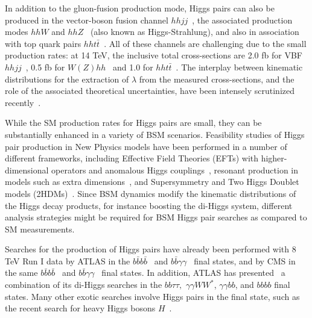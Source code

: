 In addition to the gluon-fusion production mode, Higgs pairs
can also be produced in the vector-boson fusion
channel $hhjj$~\cite{Contino:2010mh,Dolan:2013rja,Dolan:2015zja,
  Brooijmans:2014eja},
the associated production modes
$hhW$ and $hhZ$~\cite{Barger:1988jk,baglio,Cao:2015oxx}
(also known as Higgs-Strahlung),
and also in association
with top quark pairs $hht\bar{t}$~\cite{Englert:2014uqa}.
%
All of these channels are challenging due to the small production
rates: at 14 TeV, the inclusive total cross-sections are
2.0 fb for VBF $hhjj$~\cite{Liu-Sheng:2014gxa},
0.5 fb for $W(Z)hh$~\cite{baglio}
and 1.0 for $hht\bar{t}$~\cite{Englert:2014uqa}.
%
The interplay between  kinematic
distributions for the
extraction of $\lambda$ from the measured
cross-sections, and the role of the associated theoretical
uncertainties, have been intensely scrutinized
recently~\cite{Slawinska:2014vpa,Chen:2014xra,Goertz:2013kp,
  Frederix:2014hta,Dawson:2015oha,Maltoni:2014eza,Maierhofer:2013sha,Grigo:2013rya,Grigo:2014jma}.
%


While the SM production rates for Higgs
pairs are small, they can be substantially
enhanced in a variety of BSM scenarios.
%
Feasibility studies of Higgs pair production in New Physics
models have been performed in a number of different frameworks,
including Effective Field
Theories (EFTs) with higher-dimensional
operators and anomalous 
Higgs couplings~\cite{Nishiwaki:2013cma,Dall'Osso:2015aia,Azatov:2015oxa,Liu:2014rba,Goertz:2014qta,He:2015spf,Grober:2015cwa}, resonant production
in models such as extra dimensions~\cite{Gouzevitch:2013qca,Cooper:2013kia,No:2013wsa,Wen-Juan:2015gqg}, and Supersymmetry and
Two Higgs Doublet models (2HDMs)~\cite{Belyaev:1999kk,Han:2013sga,Hespel:2014sla,Wu:2015nba,Cao:2014kya,Ellwanger:2013ova}.
%
Since BSM dynamics modify
the kinematic distributions of the Higgs decay products, for
instance boosting the di-Higgs system,
different analysis strategies  might be required for BSM
Higgs pair searches as compared to SM measurements.


Searches for the production of Higgs pairs
have already been performed with 8 TeV Run I data
by ATLAS in the $b\bar{b}b\bar{b}$~\cite{Aad:2015uka}
and $b\bar{b}\gamma\gamma$~\cite{Aad:2014yja} final states,
and by
CMS in the same $b\bar{b}b\bar{b}$~\cite{Khachatryan:2015yea}
and $b\bar{b}\gamma\gamma$~\cite{Chatrchyan:2011wt} final
states.
%
%
In addition, ATLAS has presented~\cite{Aad:2015xja} a combination
of its di-Higgs searches in the $bb\tau\tau,$
$\gamma\gamma WW^*$, $\gamma\gamma bb$, and $bbbb$ final states.
%
Many other exotic searches involve Higgs pairs in the final
state, such as the recent
search for heavy Higgs bosons $H$~\cite{Khachatryan:2015tha}.



